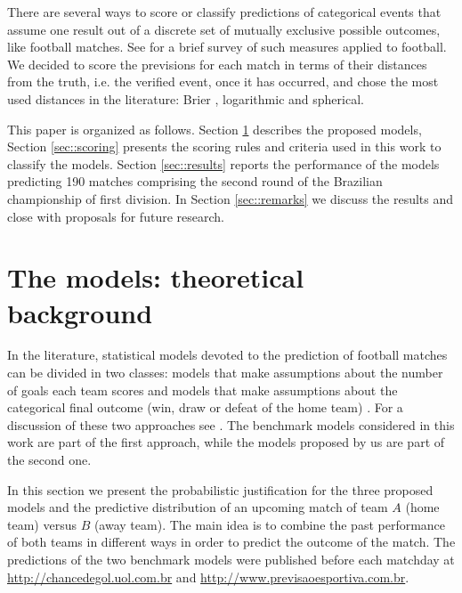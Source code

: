 \documentclass[journal,article,accept,moreauthors,pdftex,12pt,a4paper]{mdpi}
\begin{document}
There are several ways to score or classify predictions of categorical events that assume one result out of a discrete set of mutually exclusive possible outcomes, like football matches.
See \cite{constantinou} for a brief survey of such measures applied to football.
We decided to score the previsions for each match in terms of their distances from the truth, i.e. the verified event, once it has occurred, and chose the most used distances in the literature: Brier \cite{brier1950}, logarithmic and spherical.

This paper is organized as follows.
Section \ref{sec::experimental} describes the proposed models, Section \ref{sec::scoring} presents the scoring rules and criteria used in this work to classify the models.
Section \ref{sec::results} reports the performance of the models predicting 190 matches comprising the second round of the Brazilian championship of first division.
In Section \ref{sec::remarks} we discuss the results and close with proposals for future research.



\section{The models: theoretical background}
\label{sec::experimental}

In the literature, statistical models devoted to the prediction of
football matches can be divided in two classes: models that make
assumptions about the number of goals each team scores
\citep{Maher82, Dixon97, Karlis2003} and models that make
assumptions about the categorical final outcome (win, draw or defeat
of the home team) \citep{Forrest2000, Koning2000, Brillinger2008,
Brillinger2009}. For a discussion of these two approaches see
\cite{Goddard2005}. The benchmark models considered in this work are
part of the first approach, while the models proposed by us are part
of the second one.

In this section we present the probabilistic justification for the
three proposed models and the predictive distribution of an upcoming
match of team $A$ (home team) versus $B$ (away team). The main idea
is to combine the past performance of both teams in different ways
in order to predict the outcome of the match. The predictions of the
two benchmark models were published before each matchday at
\url{http://chancedegol.uol.com.br} and
\url{http://www.previsaoesportiva.com.br}.
\end{document}
